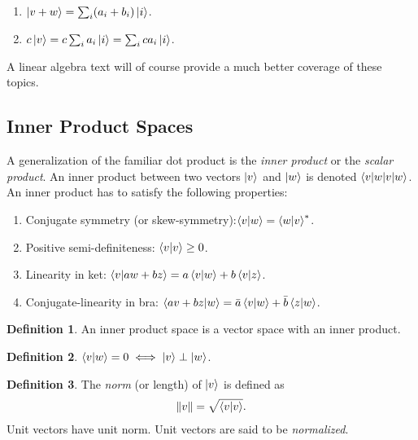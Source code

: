 \documentclass{book}
\theoremstyle{definition}
\newtheorem{defn}{Definition}[section]
\begin{document}
\begin{enumerate}
	\item $\ket{v + w} = \sum_i (a_i + b_i)\ket{i}$.
	\item $c\ket{v} = c\sum_i a_i\ket{i} = \sum_i ca_i\ket{i}$.
\end{enumerate}



A linear algebra text will of course provide a much better coverage of these topics. 















\subsection{Inner Product Spaces}


A generalization of the familiar dot product is the \textit{inner product} or the \textit{scalar product}. An inner product between two vectors $\ket{v}$ and $\ket{w}$ is denoted $\braket{v|w}$. An inner product has to satisfy the following properties:

\begin{enumerate}
	\item Conjugate symmetry (or skew-symmetry):$\braket{v}{w} = \braket{w}{v}^*$.
	\item Positive semi-definiteness: $\braket{v}{v} \geq 0$.
	\item Linearity in ket: $\braket{v}{aw + bz} = a\braket{v}{w} + b\braket{v}{z}$.
	\item Conjugate-linearity in bra: $\braket{av + bz}{w} = \bar{a}\braket{v}{w} + \bar{b}\braket{z}{w}$.
\end{enumerate}




\begin{defn}
	An inner product space is a vector space with an inner product. 
\end{defn}


\begin{defn}
	$\innerproduct{v}{w} = 0 \iff \ket{v} \perp \ket{w}$. 
\end{defn}


\begin{defn}
	The \textit{norm} (or length) of $\ket{v}$ is defined as 
	\begin{align}
	\norm{v} = \sqrt{\braket{v}}.
	\end{align}
	Unit vectors have unit norm. Unit vectors are said to be \textit{normalized}.  
\end{defn}
\end{document}
